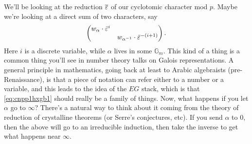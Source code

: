 \documentclass[reqno]{amsart} 
\begin{document}
We'll be looking at the reduction $\overline{\varepsilon}$ of our cyclotomic character mod $p$.  Maybe we're looking at a direct sum of two characters, say
\begin{equation}\label{eq:cnpp1hxgb1}
  \begin{pmatrix}
    w_\alpha \cdot \bar{\varepsilon}^i    &  \\
                                   & w_{\alpha^{-1}} \cdot \bar{\varepsilon}^{-(i + 1)} \\
  \end{pmatrix}.
\end{equation}
Here $i$ is a discrete variable, while $\alpha$ lives in some $\mathbb{G}_m$.  This kind of a thing is a common thing you'll see in number theory talks on Galois representations.  A general principle in mathematics, going back at least to Arabic algebraists (pre-Renaissance), is that a piece of notation can refer either to a number or a variable, and this leads to the idea of the $E G$ stack, which is that \eqref{eq:cnpp1hxgb1} should really be a family of things.  Now, what happens if you let $\alpha$ go to $\infty$?  There's a natural way to think about it coming from the theory of reduction of crystalline theorems (or Serre's conjectures, etc).  If you send $\alpha$ to $0$, then the above will go to an irreducible induction, then take the inverse to get what happens near $\infty$.
\end{document}
